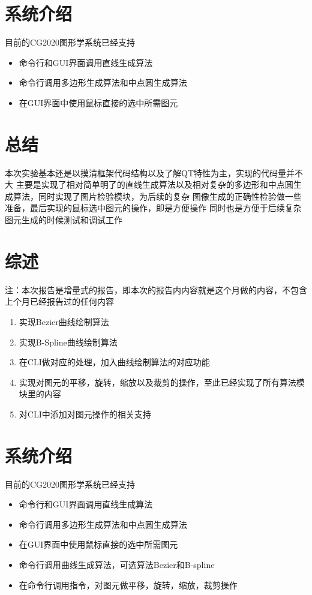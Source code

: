 \documentclass[a4paper,UTF8]{article}
\theoremstyle{definition}
\begin{document}
\section{系统介绍}
目前的CG2020图形学系统已经支持
\begin{itemize}
    \item 命令行和GUI界面调用直线生成算法
    \item 命令行调用多边形生成算法和中点圆生成算法
    \item 在GUI界面中使用鼠标直接的选中所需图元
\end{itemize}

\section{总结}
本次实验基本还是以摸清框架代码结构以及了解QT特性为主，实现的代码量并不大
主要是实现了相对简单明了的直线生成算法以及相对复杂的多边形和中点圆生成算法，同时实现了图片检验模块，为后续的复杂
图像生成的正确性检验做一些准备，最后实现的鼠标选中图元的操作，即是方便操作
同时也是方便于后续复杂图元生成的时候测试和调试工作


\section{综述}
注：本次报告是增量式的报告，即本次的报告内内容就是这个月做的内容，不包含上个月已经报告过的任何内容

\begin{enumerate}
    \item 实现Bezier曲线绘制算法
    
    \item 实现B-Spline曲线绘制算法
    
    \item 在CLI做对应的处理，加入曲线绘制算法的对应功能

    \item 实现对图元的平移，旋转，缩放以及裁剪的操作，至此已经实现了所有算法模块里的内容
    
    \item 对CLI中添加对图元操作的相关支持
\end{enumerate}



\section{系统介绍}
目前的CG2020图形学系统已经支持
\begin{itemize}
    \item 命令行和GUI界面调用直线生成算法
    \item 命令行调用多边形生成算法和中点圆生成算法
    \item 在GUI界面中使用鼠标直接的选中所需图元
    \item 命令行调用曲线生成算法，可选算法Bezier和B-spline
    \item 在命令行调用指令，对图元做平移，旋转，缩放，裁剪操作
\end{itemize}
\end{document}
